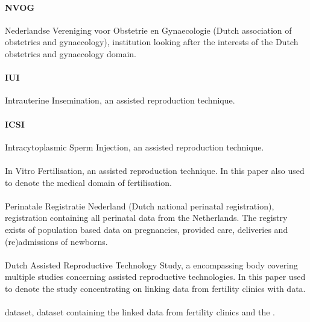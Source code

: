 \paragraph{NVOG}
Nederlandse Vereniging voor Obstetrie en Gynaecologie (Dutch association of obstetrics and gynaecology), institution looking after the interests of the Dutch obstetrics and gynaecology domain.

\paragraph{IUI}
Intrauterine Insemination, an assisted reproduction technique.

\paragraph{ICSI}
Intracytoplasmic Sperm Injection, an assisted reproduction technique.

\paragraph{\IVF{}} 
In Vitro Fertilisation, an assisted reproduction technique.
In this paper also used to denote the medical domain of fertilisation.

\paragraph{\PRN{}}
Perinatale Registratie Nederland (Dutch national perinatal registration), registration containing all perinatal data from the Netherlands.
The registry exists of population based data on pregnancies, provided care, deliveries and (re)admissions of newborns.

\paragraph{\project{}} 
Dutch Assisted Reproductive Technology Study, a encompassing body covering multiple studies concerning assisted reproductive technologies.
In this paper used to denote the study concentrating on linking data from fertility clinics with \PRN{} data.

\paragraph{\projectdata{}}
\project{} dataset, dataset containing the linked data from fertility clinics and the \PRN{}.

